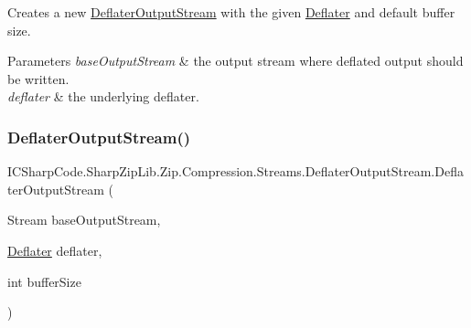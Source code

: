 Creates a new \hyperlink{class_i_c_sharp_code_1_1_sharp_zip_lib_1_1_zip_1_1_compression_1_1_streams_1_1_deflater_output_stream}{Deflater\+Output\+Stream} with the given \hyperlink{class_i_c_sharp_code_1_1_sharp_zip_lib_1_1_zip_1_1_compression_1_1_deflater}{Deflater} and default buffer size. 


\begin{DoxyParams}{Parameters}
{\em base\+Output\+Stream} & the output stream where deflated output should be written. \\
\hline
{\em deflater} & the underlying deflater. \\
\hline
\end{DoxyParams}
\mbox{\label{class_i_c_sharp_code_1_1_sharp_zip_lib_1_1_zip_1_1_compression_1_1_streams_1_1_deflater_output_stream_a8974b4f41beeceb684ab4c349c18b5a3}} 
\subsubsection{\texorpdfstring{Deflater\+Output\+Stream()}{DeflaterOutputStream()}\hspace{0.1cm}{\footnotesize\ttfamily [6/6]}}
{\footnotesize\ttfamily I\+C\+Sharp\+Code.\+Sharp\+Zip\+Lib.\+Zip.\+Compression.\+Streams.\+Deflater\+Output\+Stream.\+Deflater\+Output\+Stream (\begin{DoxyParamCaption}\item[{Stream}]{base\+Output\+Stream,  }\item[{\hyperlink{class_i_c_sharp_code_1_1_sharp_zip_lib_1_1_zip_1_1_compression_1_1_deflater}{Deflater}}]{deflater,  }\item[{int}]{buffer\+Size }\end{DoxyParamCaption})\hspace{0.3cm}{\ttfamily [inline]}}



